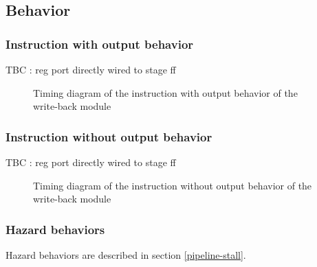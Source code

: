 

\subsection{Behavior}

\subsubsection{Instruction with output behavior}

\begin{content}
  TBC : reg port directly wired to stage ff
\end{content}

\begin{figure}[H]
    \centering
    
    \caption{Timing diagram of the instruction with output behavior of the write-back module}
    \label{fig:wbm-behavior-instruction-with-output}
\end{figure}

\subsubsection{Instruction without output behavior}

\begin{content}
  TBC : reg port directly wired to stage ff
\end{content}

\begin{figure}[H]
    \centering
    
    \caption{Timing diagram of the instruction without output behavior of the write-back module}
    \label{fig:wbm-behavior-instruction-without-output}
\end{figure}

\subsubsection{Hazard behaviors}

\begin{content}
  Hazard behaviors are described in section \ref{pipeline-stall}.
\end{content}

\newpage
